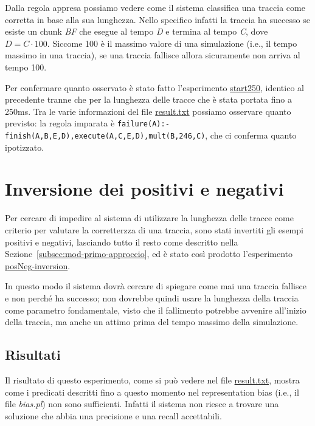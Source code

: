 Dalla regola appresa possiamo vedere come il sistema classifica una traccia come corretta in base alla sua lunghezza. Nello specifico infatti la traccia ha successo se esiste un chunk \textit{BF} che esegue al tempo \textit{D} e termina al tempo \textit{C}, dove $D=C\cdot100$. Siccome 100 è il massimo valore di una simulazione (i.e., il tempo massimo in una traccia), se una traccia fallisce allora sicuramente non arriva al tempo 100.

Per confermare quanto osservato è stato fatto l'esperimento \href{https://github.com/edoardosarri24/numsynth/tree/main/my-experiments/2-start250/}{start250}, identico al precedente tranne che per la lunghezza delle tracce che è stata portata fino a 250ms. Tra le varie informazioni del file \href{https://github.com/edoardosarri24/numsynth/tree/main/my-experiments/2-start250/result.txt}{result.txt} possiamo osservare quanto previsto: la regola imparata è \texttt{failure(A):- finish(A,B,E,D),execute(A,C,E,D),mult(B,246,C)}, che ci conferma quanto ipotizzato.

\section{Inversione dei positivi e negativi}
\label{sec:posNeg-inversion}
Per cercare di impedire al sistema di utilizzare la lunghezza delle tracce come criterio per valutare la corretterzza di una traccia, sono stati invertiti gli esempi positivi e negativi, lasciando tutto il resto come descritto nella Sezione~\ref{subsec:mod-primo-approccio}, ed è stato così prodotto l'esperimento \href{https://github.com/edoardosarri24/numsynth/tree/main/my-experiments/3-posNeg-inversion}{posNeg-inversion}.

In questo modo il sistema dovrà cercare di spiegare come mai una traccia fallisce e non perché ha successo; non dovrebbe quindi usare la lunghezza della traccia come parametro fondamentale, visto che il fallimento potrebbe avvenire all'inizio della traccia, ma anche un attimo prima del tempo massimo della simulazione.

\subsection{Risultati}
Il risultato di questo esperimento, come si può vedere nel file \href{https://github.com/edoardosarri24/numsynth/tree/main/my-experiments/3-posNeg-inversion/result.txt}{result.txt}, mostra come i predicati descritti fino a questo momento nel representation bias (i.e., il file \textit{bias.pl}) non sono sufficienti. Infatti il sistema non riesce a trovare una soluzione che abbia una precisione e una recall accettabili.

